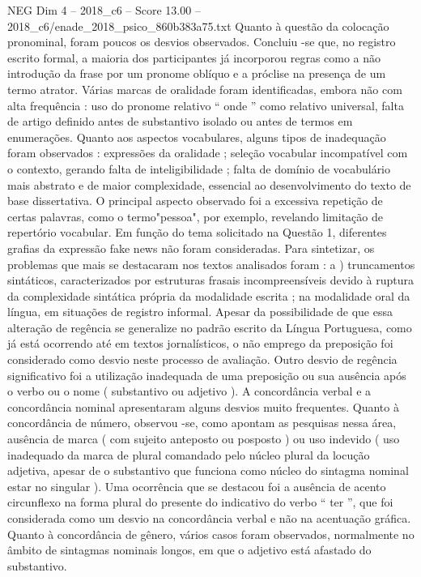 \begin{textsample}{NEG Dim 4 – 2018\_c6 – Score 13.00 – 2018\_c6/enade\_2018\_psico\_860b383a75.txt}
Quanto à questão da colocação pronominal, foram poucos os desvios observados.
Concluiu -se que, no registro escrito formal, a maioria dos participantes já incorporou regras como a não introdução da frase por um pronome oblíquo e a próclise na presença de um termo atrator.
Várias marcas de oralidade foram identificadas, embora não com alta frequência : uso do pronome relativo “ onde ” como relativo universal, falta de artigo definido antes de substantivo isolado ou antes de termos em enumerações.
Quanto aos aspectos vocabulares, alguns tipos de inadequação foram observados : expressões da oralidade ; seleção vocabular incompatível com o contexto, gerando falta de inteligibilidade ; falta de domínio de vocabulário mais abstrato e de maior complexidade, essencial ao desenvolvimento do texto de base dissertativa.
O principal aspecto observado foi a excessiva repetição de certas palavras, como o termo"pessoa", por exemplo, revelando limitação de repertório vocabular.
Em função do tema solicitado na Questão 1, diferentes grafias da expressão fake news não foram consideradas.
Para sintetizar, os problemas que mais se destacaram nos textos analisados foram : a ) truncamentos sintáticos, caracterizados por estruturas frasais incompreensíveis devido à ruptura da complexidade sintática própria da modalidade escrita ; na modalidade oral da língua, em situações de registro informal.
Apesar da possibilidade de que essa alteração de regência se generalize no padrão escrito da Língua Portuguesa, como já está ocorrendo até em textos jornalísticos, o não emprego da preposição foi considerado como desvio neste processo de avaliação.
Outro desvio de regência significativo foi a utilização inadequada de uma preposição ou sua ausência após o verbo ou o nome ( substantivo ou adjetivo ).
A concordância verbal e a concordância nominal apresentaram alguns desvios muito frequentes.
Quanto à concordância de número, observou -se, como apontam as pesquisas nessa área, ausência de marca ( com sujeito anteposto ou posposto ) ou uso indevido ( uso inadequado da marca de plural comandado pelo núcleo plural da locução adjetiva, apesar de o substantivo que funciona como núcleo do sintagma nominal estar no singular ).
Uma ocorrência que se destacou foi a ausência de acento circunflexo na forma plural do presente do indicativo do verbo “ ter ”, que foi considerada como um desvio na concordância verbal e não na acentuação gráfica.
Quanto à concordância de gênero, vários casos foram observados, normalmente no âmbito de sintagmas nominais longos, em que o adjetivo está afastado do substantivo.

\end{textsample}
